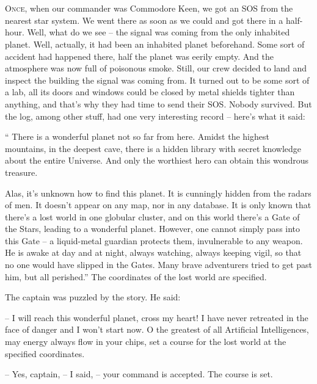 \documentclass[ebook,oneside,final,openright]{memoir}
\begin{document}
\chapter{}
\par
\lettrine{O}{nce,} when our commander was Commodore Keen, we got an SOS from the nearest star system. We went there as soon as we could and got there in a half-hour. Well, what do we see – the signal was coming from the only inhabited planet. Well, actually, it had been an inhabited planet beforehand. Some sort of accident had happened there, half the planet was eerily empty. And the atmosphere was now full of poisonous smoke. Still, our crew decided to land and inspect the building the signal was coming from. It turned out to be some sort of a lab, all its doors and windows could be closed by metal shields tighter than anything, and that’s why they had time to send their SOS. Nobody survived. But the log, among other stuff, had one very interesting record – here’s what it said:\par
\par
“ There is a wonderful planet not so far from here. Amidst the highest mountains, in the deepest cave, there is a hidden library with secret knowledge about the entire Universe. And only the worthiest hero can obtain this wondrous treasure. \par
Alas, it’s unknown how to find this planet. It is cunningly hidden from the radars of men. It doesn’t appear on any map, nor in any database. It is only known that there’s a lost world in one globular cluster, and on this world there’s a Gate of the Stars, leading to a wonderful planet. However, one cannot simply pass into this Gate – a liquid-metal guardian protects them, invulnerable to any weapon. He is awake at day and at night, always watching, always keeping vigil, so that no one would have slipped in the Gates. Many brave adventurers tried to get past him, but all perished.” The coordinates of the lost world are specified.\par
\par
The captain was puzzled by the story. He said:\par
– I will reach this wonderful planet, cross my heart! I have never retreated in the face of danger and I won’t start now. O the greatest of all Artificial Intelligences, may energy always flow in your chips, set a course for the lost world at the specified coordinates.\par
– Yes, captain, – I said, – your command is accepted. The course is set.\par
\end{document}
